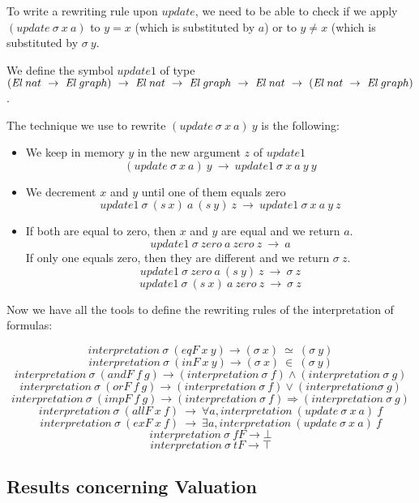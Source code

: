 \documentclass[submission,copyright,creativecommons]{eptcs}
\def\ra{\rightarrow}
\def\lra{\longrightarrow}
\def\El{{\mbox{\it El}}}
\def\imp{\mathbin{\Rightarrow}}
\def\fa{{\forall}}
\def\bltop{{\top}}
\def\blbot{{\bot}}
\def\conj{\mathbin{\wedge}}
\def\disj{\mathbin{\vee}}
\def\ex{{\exists}}
\begin{document}
To write a rewriting rule upon $update$, we need to be able to check if we apply $(update \ \sigma \ x \ a)$ to $y = x$ (which is substituted by $a$) or to $y \neq x$ (which is substituted by $\sigma \ y$.

We define the symbol $update1$ of type $(\El \ nat \ \ra \ \El~graph) \ \ra \ \El \ nat \ \ra \ \El~graph \ \ra \ \El \ nat \ \ra \ (\El \ nat \ \ra \ \El~graph)$.

The technique we use to rewrite $(update \ \sigma \ x \ a) \ y $ is the following: 

\begin{itemize}
\item We keep in memory $y$ in the new argument $z$ of $update1$
$$(update \ \sigma \ x \ a) \ y \ \lra \ update1 \ \sigma \ x \ a \ y \ y$$
\item We decrement $x$ and $y$ until one of them equals zero
$$update1 \ \sigma \ (s \ x) \ a \ (s \ y) \ z \ \lra \ update1 \ \sigma \ x \ a \ y \ z$$
\item If both are equal to zero, then $x$ and $y$ are equal and we return $a$. 
$$ update1 \ \sigma \ zero \ a \ zero \ z \ \lra \ a$$
If only one equals zero, then they are different and we return $\sigma \ z$.
$$update1 \ \sigma \ zero \ a \ (s \ y) \ z \ \lra \ \sigma \ z$$
$$update1 \ \sigma \ (s \ x) \ a \ zero \ z \ \lra \ \sigma \ z$$
\end{itemize}

Now we have all the tools to define the rewriting rules of the interpretation of formulas:

$$interpretation \ \sigma \ (eqF \ x \ y) \lra (\sigma \ x) \ \simeq \ (\sigma \ y)$$
$$interpretation \ \sigma \ (inF \ x \ y) \lra (\sigma \ x) \ \in \ (\sigma \ y)$$
$$interpretation \ \sigma \ (andF \ f \ g) \lra (interpretation \ \sigma \ f) \conj (interpretation \ \sigma \ g)$$
$$interpretation \ \sigma \ (orF \ f \ g) \lra (interpretation \ \sigma \ f) \disj  (interpretation \sigma \ g)$$
$$interpretation \ \sigma \ (impF \ f \ g) \lra (interpretation \ \sigma \ f) \imp (interpretation \ \sigma \ g)$$
$$interpretation \ \sigma \ (allF \ x \ f) \ \lra \ \fa a, interpretation \ (update \ \sigma \ x \ a) \ f$$
$$interpretation \ \sigma \ (exF \ x \ f) \ \lra \ \ex a, interpretation \ (update \ \sigma \ x \ a) \ f$$
$$interpretation \ \sigma \ fF \lra \blbot$$
$$interpretation \ \sigma \ tF \lra \bltop$$

\subsection{Results concerning Valuation}
\end{document}
